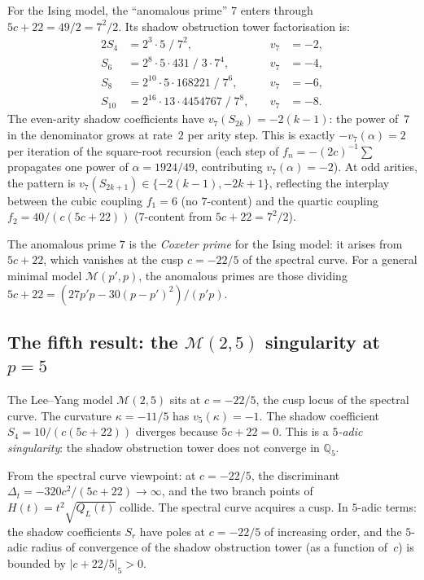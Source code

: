 \documentclass[11pt]{article}
\newcommand{\cM}{\mathcal{M}}
\newcommand{\Q}{\mathbb{Q}}
\begin{document}
For the Ising model, the ``anomalous prime'' $7$ enters through
$5c+22 = 49/2 = 7^2/2$.  Its shadow obstruction tower factorisation is:
\begin{alignat*}{2}
S_4 &= 2^3 \cdot 5 \;/\; 7^2, &\quad v_7 &= -2, \\
S_6 &= 2^8 \cdot 5 \cdot 431 \;/\; 3 \cdot 7^4,
  &\quad v_7 &= -4, \\
S_8 &= 2^{10} \cdot 5 \cdot 168221 \;/\; 7^6,
  &\quad v_7 &= -6, \\
S_{10} &= 2^{16} \cdot 13 \cdot 4454767 \;/\; 7^8,
  &\quad v_7 &= -8.
\end{alignat*}
The even-arity shadow coefficients have $v_7(S_{2k}) = -2(k-1)$:
the power of~$7$ in the denominator grows at rate~$2$ per
arity step.  This is exactly $-v_7(\alpha) = 2$ per iteration of
the square-root recursion (each step of $f_n = -(2c)^{-1}\sum$
propagates one power of $\alpha = 1924/49$, contributing
$v_7(\alpha) = -2$).  At odd arities, the pattern is
$v_7(S_{2k+1}) \in \{-2(k-1), -2k+1\}$, reflecting the interplay
between the cubic coupling $f_1 = 6$ (no $7$-content) and the
quartic coupling $f_2 = 40/(c(5c+22))$ ($7$-content from
$5c+22 = 7^2/2$).

The anomalous prime $7$ is the \emph{Coxeter prime} for the Ising
model: it arises from $5c+22$, which vanishes at the cusp
$c = -22/5$ of the spectral curve.  For a general minimal model
$\cM(p', p)$, the anomalous primes are those dividing
$5c + 22 = (27p'p - 30(p-p')^2)/(p'p)$.

\subsection*{The fifth result: the $\cM(2,5)$ singularity at
$p = 5$}

The Lee--Yang model $\cM(2,5)$ sits at $c = -22/5$, the cusp
locus of the spectral curve.  The curvature $\kappa = -11/5$
has $v_5(\kappa) = -1$.  The shadow coefficient
$S_4 = 10/(c(5c+22))$ diverges because $5c + 22 = 0$.
This is a \emph{$5$-adic singularity}: the shadow obstruction tower does not
converge in $\Q_5$.

From the spectral curve viewpoint: at $c = -22/5$, the
discriminant $\Delta_t = -320c^2/(5c+22) \to \infty$, and the
two branch points of $H(t) = t^2\sqrt{Q_L(t)}$ collide.
The spectral curve acquires a cusp.  In $5$-adic terms: the
shadow coefficients $S_r$ have poles at $c = -22/5$ of
increasing order, and the $5$-adic radius of convergence of the
shadow obstruction tower (as a function of~$c$) is bounded by
$|c + 22/5|_5 > 0$.
\end{document}
